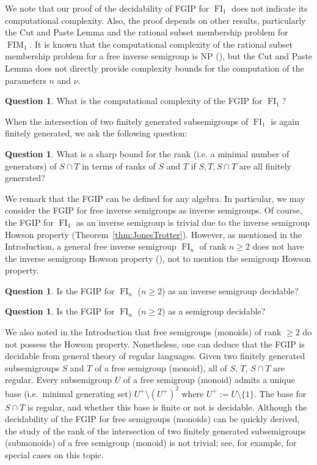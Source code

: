 \documentclass[reqno]{amsart}
\theoremstyle{plain}
\theoremstyle{definition}
\newtheorem{question}[lem]{Question}
\DeclareMathOperator{\FI}{FI}
\DeclareMathOperator{\FIM}{FIM}
\numberwithin{equation}{section}
\begin{document}
We note that our proof of the decidability of FGIP for $\FI_1$ does not indicate its computational complexity. Also, the proof depends on other results, particularly the Cut and Paste Lemma and the rational subset membership problem for $\FIM_1$. It is known that the computational complexity of the rational subset membership problem for a free inverse semigroup is NP (\cite[Theorem 3]{DiekertLohreyMiller}), but the Cut and Paste Lemma does not directly provide complexity bounds for the computation of the parameters $n$ and $\nu$.

\begin{question}
What is the computational complexity of the FGIP for $\FI_1$?
\end{question}

When the intersection of two finitely generated subsemigroups of $\FI_1$ is again finitely generated, we ask the following question: 
\begin{question}
\label{qu:rank}
What is a sharp bound for the rank (i.e. a minimal number of generators) of $S\cap T$ in terms of ranks of $S$ and $T$
if $S, T, S\cap T$ are all finitely generated?
\end{question}

We remark that the FGIP can be defined for any algebra. In particular, we may consider the FGIP for free inverse semigroups as inverse semigroups. Of course, the FGIP for $\FI_1$ as an inverse semigroup is trivial due to the inverse semigroup Howson property (Theorem~\ref{thm:JonesTrotter}). However, as mentioned in the Introduction, a general free inverse semigroup $\FI_n$ of rank $n\geq 2$ does not have the inverse semigroup Howson property (\cite{JonesTrotter}), not to mention the semigroup Howson property.



\begin{question}
Is the FGIP for $\FI_n$ ($n\geq 2$) as an inverse semigroup decidable?
\end{question}

\begin{question}
Is the FGIP for $\FI_n$ ($n\geq 2$) as a semigroup decidable?
\end{question}



We also noted in the Introduction that free semigroups (monoids) of rank $\geq 2$ do not possess the Howson property.
Nonetheless, one can deduce that the FGIP is decidable from general theory of regular languages. Given two finitely generated subsemigroups $S$ and $T$ of a free semigroup (monoid), all of $S$, $T$, $S\cap T$ are regular. Every subsemigroup $U$ of a free semigroup (monoid) admits a unique base (i.e.\ minimal generating set) $U^+\setminus (U^+)^2$ where $U^+ := U\setminus\{1\}$. The base for $S\cap T$ is regular, and whether this base is finite or not is decidable. 
Although the decidability of the FGIP for free semigroups (monoids) can be quickly derived, the study of the rank of the intersection of two finitely generated subsemigroups (submonoids) of a free semigroup (monoid) is not trivial; see, for example, \cite{Karhumaki, GiambrunoRestivo, SinghKrishna} for special cases on this topic.
\end{document}
